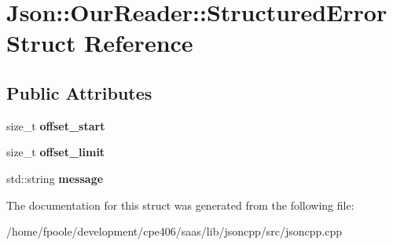\hypertarget{struct_json_1_1_our_reader_1_1_structured_error}{}\section{Json\+:\+:Our\+Reader\+:\+:Structured\+Error Struct Reference}
\label{struct_json_1_1_our_reader_1_1_structured_error}
\subsection*{Public Attributes}
\begin{DoxyCompactItemize}
\item 
\hypertarget{struct_json_1_1_our_reader_1_1_structured_error_a4eec161c2a6b4c89b6eb3d8d83834443}{}size\+\_\+t {\bfseries offset\+\_\+start}\label{struct_json_1_1_our_reader_1_1_structured_error_a4eec161c2a6b4c89b6eb3d8d83834443}

\item 
\hypertarget{struct_json_1_1_our_reader_1_1_structured_error_a6bab2650e5230fc15427b309de79fdbe}{}size\+\_\+t {\bfseries offset\+\_\+limit}\label{struct_json_1_1_our_reader_1_1_structured_error_a6bab2650e5230fc15427b309de79fdbe}

\item 
\hypertarget{struct_json_1_1_our_reader_1_1_structured_error_adc8a757b6452cc6ab14fb90b933b3414}{}std\+::string {\bfseries message}\label{struct_json_1_1_our_reader_1_1_structured_error_adc8a757b6452cc6ab14fb90b933b3414}

\end{DoxyCompactItemize}


The documentation for this struct was generated from the following file\+:\begin{DoxyCompactItemize}
\item 
/home/fpoole/development/cpe406/saas/lib/jsoncpp/src/jsoncpp.\+cpp\end{DoxyCompactItemize}
